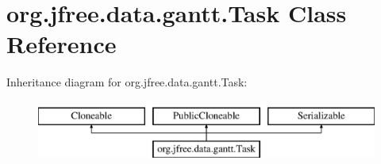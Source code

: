 \hypertarget{classorg_1_1jfree_1_1data_1_1gantt_1_1_task}{}\section{org.\+jfree.\+data.\+gantt.\+Task Class Reference}
\label{classorg_1_1jfree_1_1data_1_1gantt_1_1_task}
Inheritance diagram for org.\+jfree.\+data.\+gantt.\+Task\+:\begin{figure}[H]
\begin{center}
\leavevmode
\includegraphics[height=2.000000cm]{classorg_1_1jfree_1_1data_1_1gantt_1_1_task}
\end{center}
\end{figure}
